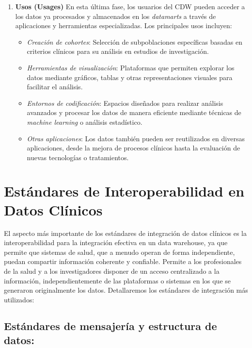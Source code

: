 \documentclass[12pt, a4paper, twoside]{article}
\begin{document}
\begin{enumerate}
		\item \textbf{Usos (Usages)}  
		En esta última fase, los usuarios del CDW pueden acceder a los datos ya procesados y almacenados en los \textit{datamarts} a través de aplicaciones y herramientas especializadas. Los principales usos incluyen:
		\begin{itemize}
			\item \textit{Creación de cohortes}: Selección de subpoblaciones específicas basadas en criterios clínicos para su análisis en estudios de investigación.  
			\item \textit{Herramientas de visualización}: Plataformas que permiten explorar los datos mediante gráficos, tablas y otras representaciones visuales para facilitar el análisis.  
			\item \textit{Entornos de codificación}: Espacios diseñados para realizar análisis avanzados y procesar los datos de manera eficiente mediante técnicas de \textit{machine learning} o análisis estadístico.  
			\item \textit{Otras aplicaciones}: Los datos también pueden ser reutilizados en diversas aplicaciones, desde la mejora de procesos clínicos hasta la evaluación de nuevas tecnologías o tratamientos.
		\end{itemize}
	\end{enumerate}
	
	
	
	
	
	\section{Estándares de Interoperabilidad en Datos Clínicos}
	
	
	El aspecto más importante de los estándares de integración de datos clínicos es la interoperabilidad para la integración efectiva en un data warehouse, ya que permite que sistemas de salud, que a menudo operan de forma independiente, puedan compartir información coherente y confiable. \cite{meditecsInteroperabilidad}
	Permite a los profesionales de la salud y a los investigadores disponer de un acceso centralizado a la información, independientemente de las plataformas o sistemas en los que se generaron originalmente los datos.\cite{meditecsInteroperabilidad}
	Detallaremos los estándares de integración más utilizados:
	
	
	\subsection{Estándares de mensajería y estructura de datos:}
	
\end{document}
